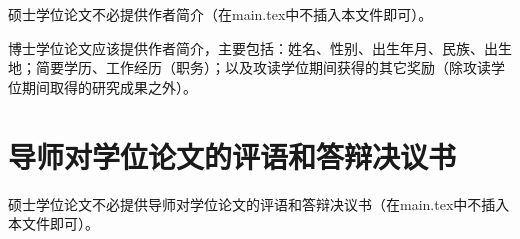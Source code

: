 \biography
硕士学位论文不必提供作者简介（在main.tex中不插入本文件即可）。

博士学位论文应该提供作者简介，主要包括：姓名、性别、出生年月、民族、出生地；简要学历、工作经历（职务）；以及攻读学位期间获得的其它奖励（除攻读学位期间取得的研究成果之外）。

\newpage
\chapter{导师对学位论文的评语和答辩决议书}

硕士学位论文不必提供导师对学位论文的评语和答辩决议书（在main.tex中不插入本文件即可）。